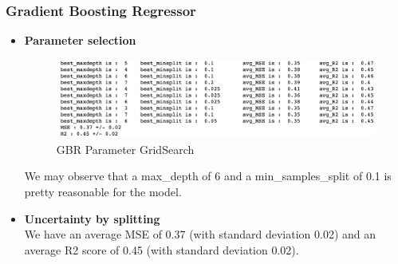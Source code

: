 \documentclass{article}
\begin{document}
\subsubsection{Gradient Boosting Regressor}

\begin{itemize}
\item \textbf{Parameter selection}

\begin{figure}[H]
\centering
\includegraphics[scale=0.4]{"gbr_param"}
\caption{GBR Parameter GridSearch}
\end{figure}

We may observe that a max\_depth of 6 and a min\_samples\_split of 0.1 is pretty reasonable for the model. 
\item \textbf{Uncertainty by splitting}\\
We have an average MSE of 0.37 (with standard deviation 0.02) and an average R2 score of 0.45 (with standard deviation 0.02). 


\end{itemize}
\end{document}
